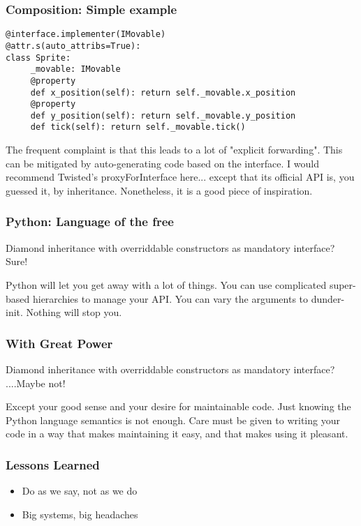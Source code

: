 \begin{frame}[fragile]
\frametitle{Composition: Simple example}
\begin{lstlisting}
@interface.implementer(IMovable)
@attr.s(auto_attribs=True):
class Sprite:
     _movable: IMovable
     @property
     def x_position(self): return self._movable.x_position
     @property
     def y_position(self): return self._movable.y_position
     def tick(self): return self._movable.tick()
\end{lstlisting}

\end{frame}

The frequent complaint is that this leads to a lot of
"explicit forwarding".
This can be mitigated by auto-generating code based on the interface.
I would recommend Twisted's proxyForInterface here...
except that its official API is,
you guessed it,
by inheritance.
Nonetheless,
it is a good piece of inspiration.

\begin{frame}[fragile]
\frametitle{Python: Language of the free}

Diamond inheritance with overriddable constructors as mandatory interface?
Sure!
\end{frame}

Python will let you get away with a lot of things.
You can use complicated super-based hierarchies to manage
your API.
You can vary the arguments to dunder-init.
Nothing will stop you.

\begin{frame}[fragile]
\frametitle{With Great Power}

Diamond inheritance with overriddable constructors as mandatory interface?
....Maybe not!
\end{frame}

Except your good sense and your desire for maintainable code.
Just knowing the Python language semantics is not enough.
Care must be given to writing your code in a way that makes maintaining
it easy,
and that makes using it pleasant.

\begin{frame}[fragile]
\frametitle{Lessons Learned}

\begin{itemize}
\item Do as we say, not as we do
\item Big systems, big headaches
\end{itemize}

\end{frame}

